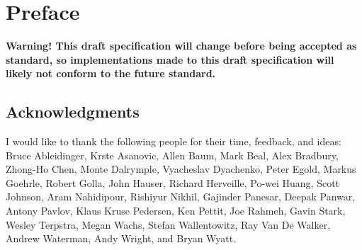 \chapter{Preface}

{\bf Warning! This draft specification will change before being accepted as
standard, so implementations made to this draft specification will likely not
conform to the future standard.}


\section*{Acknowledgments}

I would like to thank the following people for their time, feedback, and ideas:
Bruce Ableidinger,
Krste Asanovic,
Allen Baum,
Mark Beal,
Alex Bradbury,
Zhong-Ho Chen,
Monte Dalrymple,
Vyacheslav Dyachenko,
Peter Egold,
Markus Goehrle,
Robert Golla,
John Hauser,
Richard Herveille,
Po-wei Huang,
Scott Johnson,
Aram Nahidipour,
Rishiyur Nikhil,
Gajinder Panesar,
Deepak Panwar,
Antony Pavlov,
Klaus Kruse Pedersen,
Ken Pettit,
Joe Rahmeh,
Gavin Stark,
Wesley Terpstra,
Megan Wachs,
Stefan Wallentowitz,
Ray Van De Walker,
Andrew Waterman,
Andy Wright,
and Bryan Wyatt.
